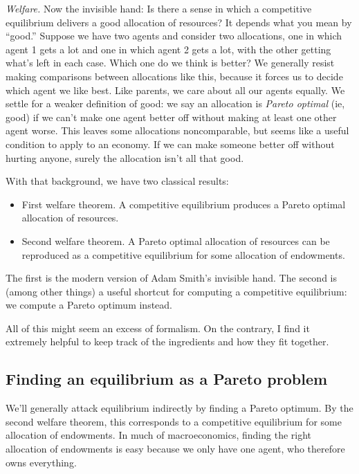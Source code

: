 \documentclass[11pt]{article}
\begin{document}
{\it Welfare.\/}  Now the invisible hand:
Is there a sense in which a competitive equilibrium delivers a
good allocation of resources?
It depends what you mean by ``good.''
Suppose we have two agents and consider two allocations,
one in which agent 1 gets a lot and one in which agent 2 gets a lot,
with the other getting what's left in each case.
Which one do we think is better?
We generally resist making comparisons between allocations like
this, because it forces us to decide which agent we like best.
Like parents, we care about all our agents equally.
We settle for a weaker definition of good:
we say an allocation is {\it Pareto optimal\/} (ie, good)
if we can't make one agent better off without making at least one
other agent worse.
This leaves some allocations noncomparable,
but seems like a useful condition to apply to an economy.
If we can make someone better off without hurting anyone,
surely the allocation isn't all that good.

With that background, we have two classical results:
%
\begin{itemize}
\item First welfare theorem.  A competitive equilibrium produces
a Pareto optimal allocation of resources.
\item Second welfare theorem.
A Pareto optimal allocation of resources can be reproduced
as a competitive equilibrium for some allocation
of endowments.
\end{itemize}
The first is the modern version of Adam Smith's invisible hand.
The second is (among other things) a useful shortcut for computing
a competitive equilibrium:  we compute a Pareto optimum instead.

All of this might seem an excess of formalism.
On the contrary, I find it extremely helpful to keep track
of the ingredients and how they fit together.


\subsection*{Finding an equilibrium as a Pareto problem}


We'll generally attack equilibrium indirectly by finding a Pareto optimum.
By the second welfare theorem, this corresponds to a competitive equilibrium for some
allocation of endowments.
In much of macroeconomics, finding the right allocation of endowments is easy
because we only have one agent, who therefore owns everything.
\end{document}
